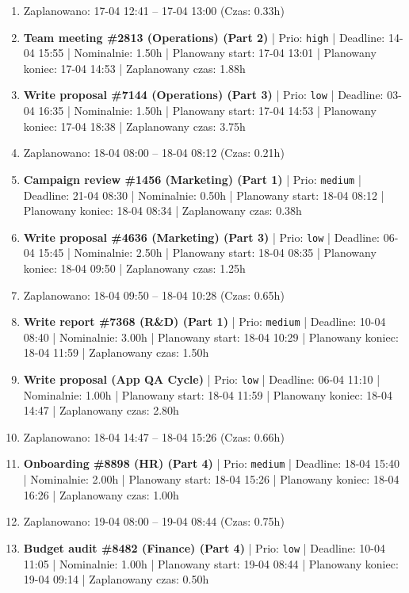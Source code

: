 {\begin{enumerate}
  \item [\textbf{PRZERWA}] Zaplanowano: 17-04 12:41 -- 17-04 13:00 (Czas: 0.33h)
  \item [\textbf{14617}] \textbf{Team meeting \#2813 (Operations) (Part 2)} | Prio: \texttt{high} | Deadline: 14-04 15:55 | Nominalnie: 1.50h | Planowany start: 17-04 13:01 | Planowany koniec: 17-04 14:53 | Zaplanowany czas: 1.88h
  \item [\textbf{14702}] \textbf{Write proposal \#7144 (Operations) (Part 3)} | Prio: \texttt{low} | Deadline: 03-04 16:35 | Nominalnie: 1.50h | Planowany start: 17-04 14:53 | Planowany koniec: 17-04 18:38 | Zaplanowany czas: 3.75h
  \item [\textbf{PRZERWA}] Zaplanowano: 18-04 08:00 -- 18-04 08:12 (Czas: 0.21h)
  \item [\textbf{14653}] \textbf{Campaign review \#1456 (Marketing) (Part 1)} | Prio: \texttt{medium} | Deadline: 21-04 08:30 | Nominalnie: 0.50h | Planowany start: 18-04 08:12 | Planowany koniec: 18-04 08:34 | Zaplanowany czas: 0.38h
  \item [\textbf{14684}] \textbf{Write proposal \#4636 (Marketing) (Part 3)} | Prio: \texttt{low} | Deadline: 06-04 15:45 | Nominalnie: 2.50h | Planowany start: 18-04 08:35 | Planowany koniec: 18-04 09:50 | Zaplanowany czas: 1.25h
  \item [\textbf{PRZERWA}] Zaplanowano: 18-04 09:50 -- 18-04 10:28 (Czas: 0.65h)
  \item [\textbf{14633}] \textbf{Write report \#7368 (R\&D) (Part 1)} | Prio: \texttt{medium} | Deadline: 10-04 08:40 | Nominalnie: 3.00h | Planowany start: 18-04 10:29 | Planowany koniec: 18-04 11:59 | Zaplanowany czas: 1.50h
  \item [\textbf{14695}] \textbf{Write proposal (App QA Cycle)} | Prio: \texttt{low} | Deadline: 06-04 11:10 | Nominalnie: 1.00h | Planowany start: 18-04 11:59 | Planowany koniec: 18-04 14:47 | Zaplanowany czas: 2.80h
  \item [\textbf{PRZERWA}] Zaplanowano: 18-04 14:47 -- 18-04 15:26 (Czas: 0.66h)
  \item [\textbf{14636}] \textbf{Onboarding \#8898 (HR) (Part 4)} | Prio: \texttt{medium} | Deadline: 18-04 15:40 | Nominalnie: 2.00h | Planowany start: 18-04 15:26 | Planowany koniec: 18-04 16:26 | Zaplanowany czas: 1.00h
  \item [\textbf{PRZERWA}] Zaplanowano: 19-04 08:00 -- 19-04 08:44 (Czas: 0.75h)
  \item [\textbf{14694}] \textbf{Budget audit \#8482 (Finance) (Part 4)} | Prio: \texttt{low} | Deadline: 10-04 11:05 | Nominalnie: 1.00h | Planowany start: 19-04 08:44 | Planowany koniec: 19-04 09:14 | Zaplanowany czas: 0.50h

\end{enumerate}}
